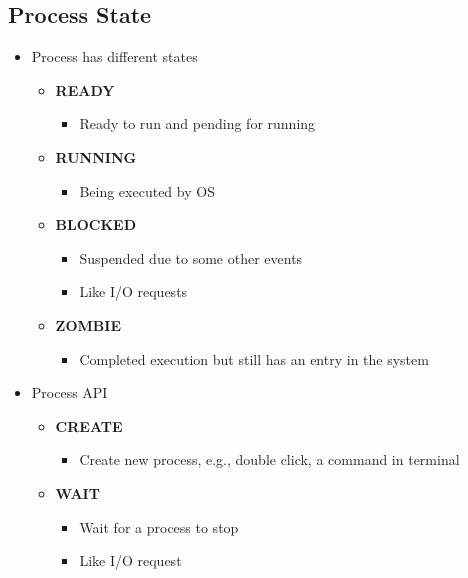 \documentclass[a4paper,11pt,english]{article}
\begin{document}
\subsection*{Process State}
\begin{itemize}
    \item Process has different states
        \begin{itemize}
            \item \textbf{\color{blue}READY}
                \begin{itemize}
                    \item Ready to run and pending for running
                \end{itemize}
            \item \textbf{\color{blue}RUNNING}
                \begin{itemize}
                    \item Being executed by OS
                \end{itemize}
            \item \textbf{\color{blue}BLOCKED}
                \begin{itemize}
                    \item Suspended due to some other events
                    \item Like I/O requests
                \end{itemize}
            \item \textbf{\color{blue}ZOMBIE}
                \begin{itemize}
                    \item Completed execution but still has an entry in the system 
                \end{itemize}
        \end{itemize}
    \item Process API
        \begin{itemize}
            \item \textbf{\color{blue}CREATE}
                \begin{itemize}
                    \item Create new process, e.g., double click, a command in terminal
                \end{itemize}
            \item \textbf{\color{blue}WAIT}
                \begin{itemize}
                    \item Wait for a process to stop
                    \item Like I/O request

\end{itemize}
\end{itemize}
\end{itemize}
\end{document}
